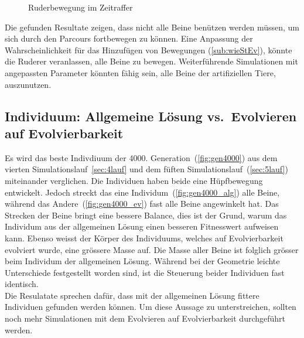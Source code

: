 \begin{figure}[H]
        \caption{Ruderbewegung im Zeitraffer\label{fig:ruder}}

      \end{figure}

      Die gefunden Resultate zeigen,
      dass nicht alle Beine benützen werden müssen, um sich durch den Parcours fortbewegen zu können.
      Eine Anpassung der Wahrscheinlichkeit für das Hinzufügen von Bewegungen (\vref{sub:wieStEv}),
      könnte die Ruderer veranlassen, alle Beine zu bewegen.
      Weiterführende Simulationen mit angepassten Parameter könnten fähig sein,
      alle Beine der artifiziellen Tiere, auszunutzen.

    \subsection{Individuum: Allgemeine Lösung vs.\ Evolvieren auf Evolvierbarkeit}

      Es wird das beste Indivdiuum der 4000. Generation~(\vref{fig:gen4000}) aus dem vierten Simulationslauf~\vref{sec:4lauf}
      und dem füften Simulationslauf~(\vref{sec:5lauf}) miteinander verglichen.
      Die Individuen haben beide eine Hüpfbewegung entwickelt.
      Jedoch streckt das eine Individum~(\vref{fig:gen4000_alg}) alle Beine,
      während das Andere~(\vref{fig:gen4000_ev}) fast alle Beine angewinkelt hat.
      Das Strecken der Beine bringt eine bessere Balance,
      dies ist der Grund, warum das Individum aus der allgemeinen Lösung einen besseren Fitnesswert aufweisen kann.
      Ebenso weisst der Körper des Individuums, welches auf Evolvierbarkeit evolviert wurde, eine grössere Masse auf.
      Die Masse aller Beine ist folglich grösser beim Individum der allgemeinen Lösung.
      Während bei der Geometrie leichte Unterschiede festgestellt worden sind, ist die Steuerung beider Individuen fast identisch.
      \\
      Die Resulatate sprechen dafür, dass mit der allgemeinen Lösung fittere Individuen gefunden werden können.
      Um diese Aussage zu unterstreichen, sollten noch mehr Simulationen mit dem Evolvieren auf Evolvierbarkeit durchgeführt werden.

